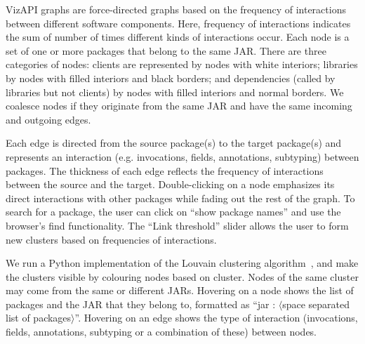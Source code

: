 VizAPI graphs are force-directed graphs based on the frequency of
interactions between different software components. 
Here, frequency of interactions indicates the sum of number of times different kinds of interactions occur.
Each node is a
set of one or more packages that belong to the same JAR.  There are
three categories of nodes: clients are represented by nodes with white
interiors; libraries by nodes with filled interiors and black borders;
and dependencies (called by libraries but not clients) by nodes with
filled interiors and normal borders.  We coalesce nodes if they
originate from the same JAR and have the same incoming and
outgoing edges.

Each edge is directed
from the source package(s) to the target package(s) and represents an interaction 
(e.g. invocations, fields, annotations, subtyping) between packages. 
The thickness of each edge reflects the frequency of interactions between the source and the target.
Double-clicking on a node emphasizes its direct interactions with other packages while fading out the rest of the graph.
To search for a package, the user can click on ``show package
names'' and use the browser’s find functionality. 
The ``Link threshold'' slider allows the user to form new clusters based on frequencies of interactions.


We run a Python implementation of the Louvain clustering algorithm~\cite{blondel2008fast}, and make the clusters 
visible by colouring nodes based on cluster.
Nodes of the same cluster may come from the same or different JARs.
Hovering on a node shows the list of packages and 
the JAR that they belong to, 
formatted as ``jar : $\langle$space separated list of packages$\rangle$''. 
Hovering on an edge shows the type of interaction (invocations, fields, annotations, subtyping or a combination of these) between nodes.
